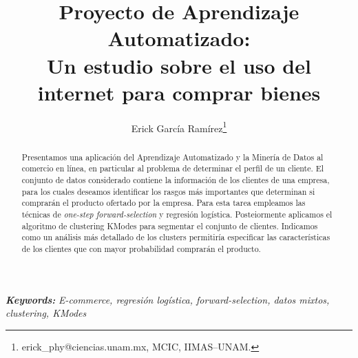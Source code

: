 \documentclass[letterpaper,11pt]{article}
\providecommand{\keywords}[1]{\textbf{\small \textit{Keywords:}} {\small\em #1}}
\begin{document}
\title{Proyecto de Aprendizaje Automatizado:\\
{\Large Un estudio sobre el uso del internet para comprar bienes}}
\author{Erick García Ramírez\footnote{
erick\_phy@ciencias.unam.mx, MCIC, IIMAS--UNAM.}}

\maketitle
\begin{abstract}
    \noindent Presentamos una aplicación del Aprendizaje Automatizado y la Minería de Datos al comercio en línea, en
    particular al problema de determinar el perfil de un cliente. El conjunto de datos considerado contiene la
    información de los clientes de una empresa, para los cuales deseamos identificar los rasgos 
    más importantes que determinan si comprarán el producto ofertado por la empresa. Para esta tarea empleamos las técnicas de
\emph{one-step forward-selection} y regresión logística.  Posteiormente aplicamos el algoritmo de clustering KModes para
segmentar el conjunto de clientes. Indicamos como un análisis más detallado de los clusters permitiría especificar 
las características de los clientes que con mayor probabilidad comprarán el producto.
\end{abstract}
\keywords{E-commerce, regresión logística, forward-selection, datos mixtos, clustering, KModes}

\vspace{\baselineskip}
\end{document}

